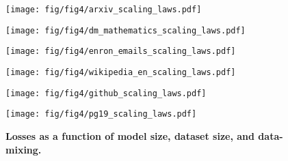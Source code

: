 \begin{figure*}%
    \centering
    \begin{minipage}{0.45\textwidth}
        \texttt{[image: fig/fig4/arxiv\_scaling\_laws.pdf]}
    \end{minipage}
    \begin{minipage}{0.45\textwidth}
        \texttt{[image: fig/fig4/dm\_mathematics\_scaling\_laws.pdf]}
    \end{minipage}
    \vspace{0.5cm}
    \begin{minipage}{0.45\textwidth}
        \texttt{[image: fig/fig4/enron\_emails\_scaling\_laws.pdf]}
    \end{minipage}
    \begin{minipage}{0.45\textwidth}
        \texttt{[image: fig/fig4/wikipedia\_en\_scaling\_laws.pdf]}
    \end{minipage}
    \vspace{0.5cm}
    \begin{minipage}{0.45\textwidth}
        \texttt{[image: fig/fig4/github\_scaling\_laws.pdf]}
    \end{minipage}
    \begin{minipage}{0.45\textwidth}
        \texttt{[image: fig/fig4/pg19\_scaling\_laws.pdf]}
    \end{minipage}
    \caption{\textbf{Losses as a function of model size, dataset size, and data-mixing.}}
    \label{fig:fig4grid}
\end{figure*}

